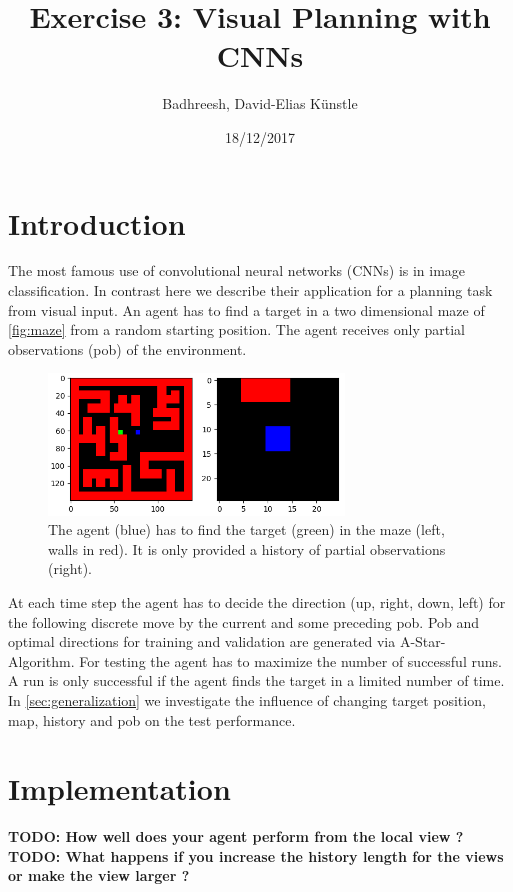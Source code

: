 \documentclass[a4paper,14pt]{article}
\begin{document}
\title{Exercise 3: Visual Planning with CNNs}
\author{Badhreesh, David-Elias K\"unstle}
\date{18/12/2017}
\maketitle
\section{Introduction}

The most famous use of convolutional neural networks (CNNs) is in image classification.
In contrast here we describe their application for a planning task from visual input.
An agent has to find a target in a two dimensional maze of \autoref{fig:maze} from a random starting
position. The agent receives only partial observations (pob) of the environment.

\begin{figure}[h]
  \centering
  \includegraphics[width=0.7\textwidth]{maze}
  \caption{The agent (blue) has to find the target (green) in the maze (left,
    walls in red). It is only provided a history of partial observations
    (right).}
  \label{fig:maze}
\end{figure}

At each time step the agent has to decide the direction (up, right, down, left)
for the following discrete move by the current and some preceding pob.
Pob and optimal directions for training and validation are generated via
A-Star-Algorithm.
For testing the agent has to maximize the number of successful runs.
A run is only successful if the agent finds the target in a limited number of
time.
In \autoref{sec:generalization} we investigate the influence of changing target position, map,
history and pob on the test performance.

\section{Implementation}
\textbf{TODO: How well does your agent perform from the local view ?}
\textbf{TODO: What happens if you increase the history length for the views or make the
view larger ?}
\end{document}
